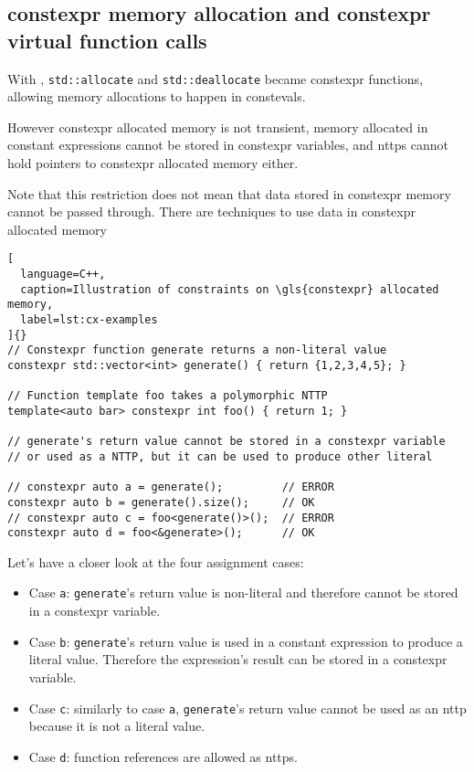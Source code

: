\documentclass[../main]{subfiles}
\begin{document}
\subsection{
  \gls{constexpr} memory allocation and \gls{constexpr} virtual function calls
}

With , \lstinline{std::allocate} and \lstinline{std::deallocate}
became \gls{constexpr} functions, allowing memory allocations to happen in
\glspl{consteval}.

However \gls{constexpr} allocated memory is not transient, \ie memory allocated in
constant expressions cannot be stored in \gls{constexpr} variables, and \glspl{nttp}
cannot hold pointers to \gls{constexpr} allocated memory either.

Note that this restriction does not mean that data stored in \gls{constexpr} memory
cannot be passed through. There are techniques to use data in \gls{constexpr}
allocated memory

\begin{lstlisting}[
  language=C++,
  caption=Illustration of constraints on \gls{constexpr} allocated memory,
  label=lst:cx-examples
]{}
// Constexpr function generate returns a non-literal value
constexpr std::vector<int> generate() { return {1,2,3,4,5}; }

// Function template foo takes a polymorphic NTTP
template<auto bar> constexpr int foo() { return 1; }

// generate's return value cannot be stored in a constexpr variable
// or used as a NTTP, but it can be used to produce other literal

// constexpr auto a = generate();         // ERROR
constexpr auto b = generate().size();     // OK
// constexpr auto c = foo<generate()>();  // ERROR
constexpr auto d = foo<&generate>();      // OK
\end{lstlisting}

Let's have a closer look at the four assignment cases:

\begin{itemize}
\item Case \lstinline{a}: \lstinline{generate}'s return value is non-literal
      and therefore cannot be stored in a \gls{constexpr} variable.
\item Case \lstinline{b}: \lstinline{generate}'s return value is used in a
      constant expression to produce a literal value.
      Therefore the expression's result can be stored in a \gls{constexpr} variable.
\item Case \lstinline{c}: similarly to case \lstinline{a},
      \lstinline{generate}'s return value cannot be used as an \gls{nttp} because it
      is not a literal value.
\item Case \lstinline{d}: function references are allowed as \glspl{nttp}.
\end{itemize}
\end{document}
